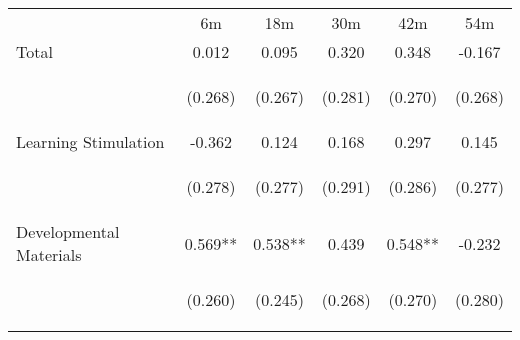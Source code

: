 \begin{tabular}{lccccc}
\hline \noalign{\smallskip} & 6m & 18m & 30m & 42m & 54m\\
\noalign{\smallskip}\hline \noalign{\smallskip}Total & 0.012 & 0.095 & 0.320 & 0.348 & -0.167\\
 & \begin{footnotesize}(0.268)\end{footnotesize} & \begin{footnotesize}(0.267)\end{footnotesize} & \begin{footnotesize}(0.281)\end{footnotesize} & \begin{footnotesize}(0.270)\end{footnotesize} & \begin{footnotesize}(0.268)\end{footnotesize}\\
\noalign{\smallskip}Learning Stimulation & -0.362 & 0.124 & 0.168 & 0.297 & 0.145\\
 & \begin{footnotesize}(0.278)\end{footnotesize} & \begin{footnotesize}(0.277)\end{footnotesize} & \begin{footnotesize}(0.291)\end{footnotesize} & \begin{footnotesize}(0.286)\end{footnotesize} & \begin{footnotesize}(0.277)\end{footnotesize}\\
\noalign{\smallskip}Developmental Materials & 0.569** & 0.538** & 0.439 & 0.548** & -0.232\\
 & \begin{footnotesize}(0.260)\end{footnotesize} & \begin{footnotesize}(0.245)\end{footnotesize} & \begin{footnotesize}(0.268)\end{footnotesize} & \begin{footnotesize}(0.270)\end{footnotesize} & \begin{footnotesize}(0.280)\end{footnotesize}\\

\end{tabular}
